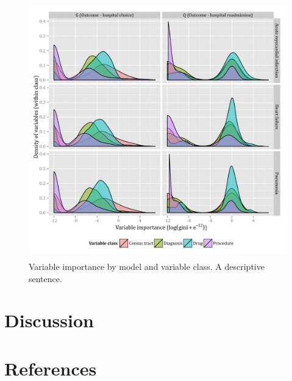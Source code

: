 \documentclass[]{article}
\begin{document}
\begin{figure}[H]
    \includegraphics{../figures/variable_importance_by_model_and_class.png}
    \caption[Error rate for random forest model of hospital choice.]
      {Variable importance by model and variable class. A descriptive sentence.}
    \label{fig:variable_importance_by_model_and_class}
\end{figure}


\section{Discussion}


\section{References}
\printbibliography
\end{document}
